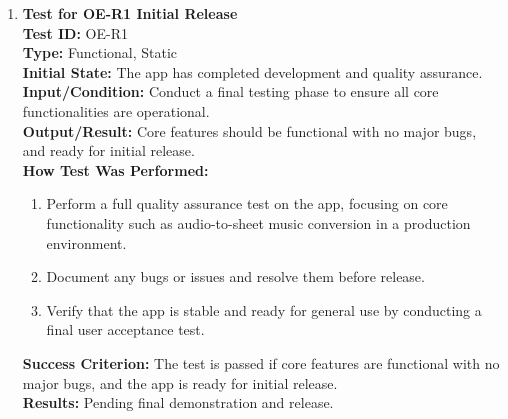 \documentclass[12pt, titlepage]{article}
\begin{document}
\begin{enumerate}
    \item \textbf{Test for OE-R1 Initial Release} \\
      \newline
      \textbf{Test ID:} OE-R1 \\
      \textbf{Type:} Functional, Static \\
      \textbf{Initial State:} The app has completed development and quality assurance. \\
      \textbf{Input/Condition:} Conduct a final testing phase to ensure all core functionalities are operational. \\
      \textbf{Output/Result:} Core features should be functional with no major bugs, and ready for initial release. \\
      \textbf{How Test Was Performed:}
      \begin{enumerate}
          \item Perform a full quality assurance test on the app, focusing on core functionality such as audio-to-sheet music 
          conversion in a production environment.
          \item Document any bugs or issues and resolve them before release.
          \item Verify that the app is stable and ready for general use by conducting a final user acceptance test.
      \end{enumerate}
      \textbf{Success Criterion:} The test is passed if core features are functional with no major bugs, and the app is ready for initial release.\\
      \textbf{Results:} Pending final demonstration and release.\\

\end{enumerate}
\end{document}
